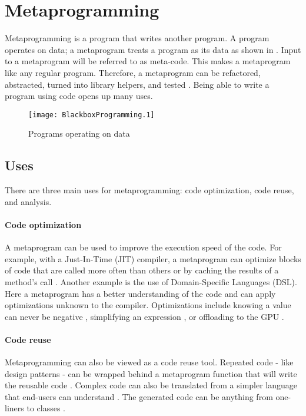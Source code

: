\section{Metaprogramming}
Metaprogramming is a program that writes another program.
A program operates on data; a metaprogram treats a program as its data as shown in  \cite{savidis_19_01, anggoro_17_01, sheard_01_01}.
Input to a metaprogram will be referred to as meta-code.
This makes a metaprogram like any regular program.
Therefore, a metaprogram can be refactored, abstracted, turned into library helpers, and tested \cite{lilis_15_01}.
Being able to write a program using code opens up many uses.

\begin{figure}[h]
	\centering
	\texttt{[image: BlackboxProgramming.1]}
	\caption{Programs operating on data}
	\label{fig:BlackboxProgramming}
\end{figure}


\subsection{Uses}
There are three main uses for metaprogramming: code optimization, code reuse, and analysis.

\paragraph{Code optimization}
A metaprogram can be used to improve the execution speed of the code.
For example, with a Just-In-Time (JIT) compiler, a metaprogram can optimize blocks of code that are called more often than others \cite{hinsen_13_01} or by caching the results of a method's call \cite{seaton_15_01}.
Another example is the use of Domain-Specific Languages (DSL). 
Here a metaprogram has a better understanding of the code and can apply optimizations unknown to the compiler.
Optimizations include knowing a value can never be negative \cite{hinsen_13_01}, simplifying an expression \cite{sheard_01_01}, or offloading to the GPU \cite{videau_18_01}.

\paragraph{Code reuse}
Metaprogramming can also be viewed as a code reuse tool.
Repeated code - like design patterns \cite{lilis_15_01, alexandrescu_01_01} - can be wrapped behind a metaprogram function that will write the reusable code \cite{savidis_19_01, klabnik_2019_01}.
Complex code can also be translated from a simpler language that end-users can understand \cite{hinsen_13_01}.
The generated code can be anything from one-liners to classes \cite{savidis_19_01}.

